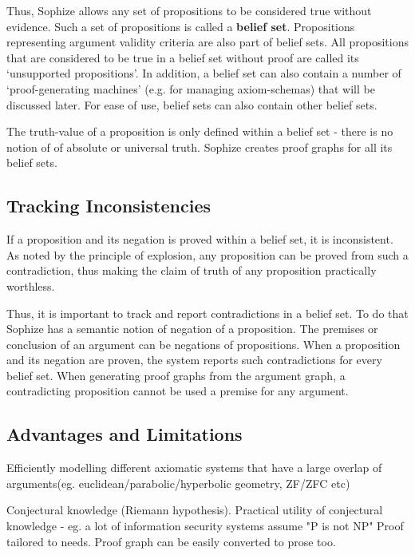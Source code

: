 \documentclass[runningheads]{llncs}
\begin{document}
Thus, Sophize allows any set of propositions to be considered true without evidence. Such a set of propositions is called a \textbf{belief set}. Propositions representing argument validity criteria are also part of belief sets. All propositions that are considered to be true in a belief set without proof are called its `unsupported propositions'. In addition, a belief set can also contain a number of `proof-generating machines' (e.g. for managing axiom-schemas) that will be discussed later. For ease of use, belief sets can also contain other belief sets.

The truth-value of a proposition is only defined within a belief set - there is no notion of of absolute or universal truth. Sophize creates proof graphs for all its belief sets.

\subsection{Tracking Inconsistencies}
If a proposition and its negation is proved within a belief set, it is inconsistent. As noted by the principle of explosion, any proposition can be proved from such a contradiction, thus making the claim of truth of any proposition practically worthless.

Thus, it is important to track and report contradictions in a belief set. To do that Sophize has a semantic notion of negation of a proposition. The premises or conclusion of an argument can be negations of propositions. When a proposition and its negation are proven, the system reports such contradictions for every belief set. When generating proof graphs from the argument graph, a contradicting proposition cannot be used a premise for any argument.

\subsection{Advantages and Limitations}

Efficiently modelling different axiomatic systems that have a large overlap of arguments(eg. euclidean/parabolic/hyperbolic geometry, ZF/ZFC etc)

Conjectural knowledge (Riemann hypothesis). 
Practical utility of conjectural knowledge - eg. a lot of information security systems assume "P is not NP"
Proof tailored to needs. Proof graph can be easily converted to prose too.
\end{document}
